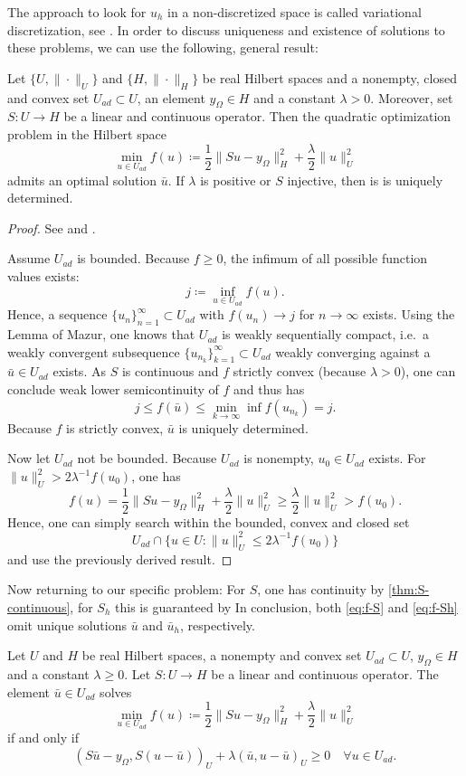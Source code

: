 \documentclass[../thesis.tex]{subfiles}
\begin{document}
The approach to look for $u_h$ in a non-discretized space is called variational discretization, see \cite{Hinze}.
In order to discuss uniqueness and existence of solutions to these problems, we can use the following, general result:
\begin{theorem}
Let $\{ U, \| \cdot \|_U \}$ and $\{ H, \| \cdot \|_H \}$ be real Hilbert spaces and a nonempty, closed and convex set $U_{ad} \subset U$, an element $y_\Omega \in H$ and a constant $\lambda > 0$.
Moreover, set $S : U \to H$ be a linear and continuous operator.
Then the quadratic optimization problem in the Hilbert space
\[
	\min_{u \in U_{ad}} f(u) \coloneqq \frac{1}{2} \| Su - y_\Omega \|_H^2 + \frac{\lambda}{2} \| u \|_U^2
\]
admits an optimal solution $\bar{u}$. If $\lambda$ is positive or $S$ injective, then is is uniquely determined.
\end{theorem}
\begin{proof}
See \cite[Satz 2.14]{Troeltzsch} and \cite[Satz 2.15]{Troeltzsch}.

Assume $U_{ad}$ is bounded. Because $f \geq 0$, the infimum of all possible function values exists:
\[
	j \coloneqq \inf_{u \in U_{ad}} f(u).
\]
Hence, a sequence $\{ u_n \}_{n=1}^\infty \subset U_{ad}$ with $f(u_n) \to j$ for $n \to \infty$ exists.
Using the Lemma of Mazur, one knows that $U_{ad}$ is weakly sequentially compact, i.e.\ a weakly convergent subsequence $\{ u_{n_k} \}_{k=1}^\infty \subset U_{ad}$ weakly converging against a $\bar{u} \in U_{ad}$ exists.
As $S$ is continuous and $f$ strictly convex (because $\lambda > 0$), one can conclude weak lower semicontinuity of $f$ and thus has
\[
	j \leq f(\bar{u}) \leq \min_{k \to \infty} \inf f(u_{n_k}) = j.
\]
Because $f$ is strictly convex, $\bar{u}$ is uniquely determined.

Now let $U_{ad}$ not be bounded. Because $U_{ad}$ is nonempty, $u_0 \in U_{ad}$ exists. For $\| u \|_U^2 > 2 \lambda^{-1} f(u_0)$, one has
\[
	f(u) = \frac{1}{2} \| S u - y_\Omega \|_H^2 + \frac{\lambda}{2} \| u \|_U^2 \geq \frac{\lambda}{2} \| u \|_U^2 > f(u_0).
\]
Hence, one can simply search within the bounded, convex and closed set
\[
	U_{ad} \cap \{ u \in U : \| u \|_U^2 \leq 2 \lambda^{-1} f(u_0) \}
\]
and use the previously derived result.
\end{proof}
Now returning to our specific problem: For $S$, one has continuity by \cref{thm:S-continuous}, for $S_h$ this is guaranteed by %
In conclusion, both \cref{eq:f-S} and \cref{eq:f-Sh} omit unique solutions $\bar{u}$ and $\bar{u}_h$, respectively.
\begin{theorem}
\label{thm:variational-ineq}
Let $U$ and $H$ be real Hilbert spaces, a nonempty and convex set $U_{ad} \subset U$, $y_\Omega \in H$ and a constant $\lambda \geq 0$. Let $S : U \to H$ be a linear and continuous operator.
The element $\bar{u} \in U_{ad}$ solves
\[
	\min_{u \in U_{ad}} f(u) \coloneqq \frac{1}{2} \| Su - y_\Omega \|_H^2 + \frac{\lambda}{2} \| u \|_U^2
\]
if and only if
\[
	( S \bar{u} - y_\Omega, S ( u - \bar{u} ) )_U + \lambda ( \bar{u}, u - \bar{u} )_U \geq 0 \quad \forall u \in U_{ad}.
\]
\end{theorem}
\end{document}
